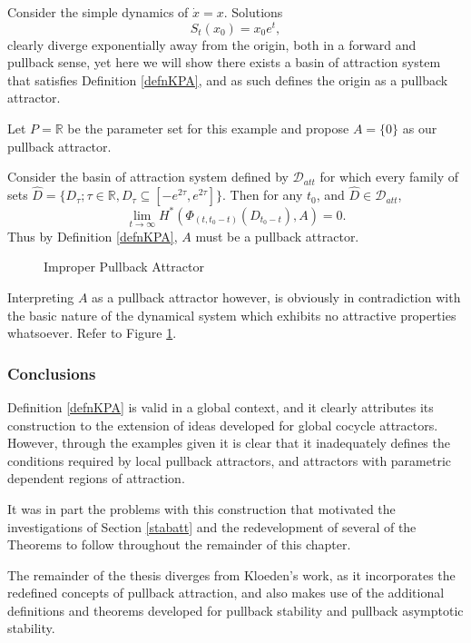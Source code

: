 \begin{example}
\label{improperpaeg}
Consider the simple dynamics of $\dot{x} = x$. Solutions
\[ S_t(x_0) = x_0 e^{t}, \]
clearly diverge exponentially away from the origin, both in a forward and
pullback sense, yet here we will show there exists a basin of attraction system
that satisfies Definition \ref{defnKPA}, and as such defines the origin as a
pullback attractor.

Let $P = \mathbb{R}$ be the parameter set for this example and propose $A =
\{0\}$ as our pullback attractor.

Consider the basin of attraction system defined by $\mathcal{D}_{att}$ for
which every family of sets $\hat{D} = \{D_{\tau}; \tau \in \mathbb{R}, D_{\tau}
\subseteq [-e^{2\tau},e^{2\tau}] \}$. Then for any $t_0$, and $\hat{D} \in
\mathcal{D}_{att}$,
\[ \lim_{t \to \infty} H^*(\Phi_{(t, t_0 - t)}(D_{t_0 - t}),A) = 0. \]
Thus by Definition \ref{defnKPA}, $A$ must be a pullback attractor.

\begin{figure}[htb]
\begin{center}

\caption{Improper Pullback Attractor}
\protect\label{improperpafig}
\end{center}
\end{figure}

Interpreting $A$ as a pullback attractor however, is obviously in contradiction
with the basic nature of the dynamical system which exhibits no attractive
properties whatsoever. Refer to Figure \ref{improperpafig}.
\end{example}

\subsubsection{Conclusions}

Definition \ref{defnKPA} is valid in a global  context, and it clearly
attributes its construction to the extension of ideas developed for global
cocycle attractors. However, through the examples given it is clear that it
inadequately defines the conditions required by local pullback attractors, and
attractors with parametric dependent regions of attraction.

It was in part the problems with this construction that motivated
the investigations of Section \ref{stabatt} and the redevelopment of several of
the Theorems to follow throughout the remainder of this chapter.

The remainder of the thesis diverges from Kloeden's work, as it
incorporates the redefined concepts of pullback attraction, and also makes use
of the additional definitions and theorems developed for pullback stability and
pullback asymptotic stability.

